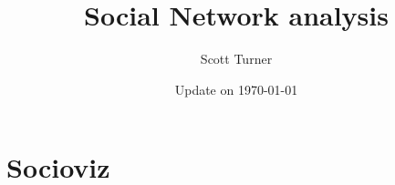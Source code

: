 \documentclass[11pt,twoside]{book}
\begin{document}
\title{\bf \huge Social Network analysis}
\author{Scott Turner}
\date{Update on \today}
\maketitle
\setcounter{tocdepth}{2}
\setcounter{minitocdepth}{1} 

\begin{multicols}{2}
    \dominitoc%
    \adjustmtc[2]%
    \tableofcontents
    \label{toc-contents}
\end{multicols}

	\listoffigures
\begin{multicols}{2}
	\listoftheorems[ignoreall,show={theorem}]
\end{multicols}

	\renewcommand{\listtheoremname}{List of Definitions}
\begin{multicols}{2}
	\listoftheorems[ignoreall,show={definition}]
\end{multicols}

	\printglossary




\part{Socioviz}






\backmatter


\printbibliography[heading=bibintoc]
\printindex
\end{document}

